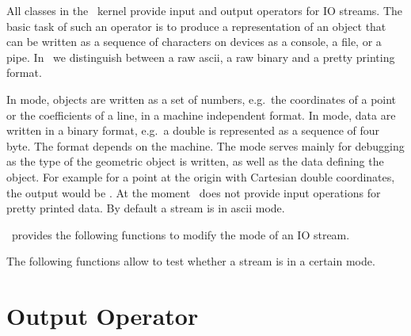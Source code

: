 
All classes in the \cgal\ kernel provide input and output operators for
IO streams.  The basic task of such an operator is to produce a
representation of an object that can be written as a sequence of
characters on devices as a console, a file, or a pipe. In \cgal\ 
we distinguish between  a raw ascii, a raw binary and a 
pretty printing format. 



In  mode, objects are written as
a set of  numbers, e.g.\ the coordinates of a point or
the coefficients of a line, in a machine independent format. 
In  mode,
data are written in a binary format, e.g.\ a double is represented
as a sequence of four byte. The format depends on the machine. 
The mode  
serves mainly for debugging as the type of the geometric
object is written, as well as the data defining the object. For example
for a point at the origin with Cartesian double coordinates, the output
would be \ccc{PointC2(0.0, 0.0)}.  At the moment \cgal\ does not
provide input operations for pretty printed data. By default a stream
is in {\sc ascii} mode.


\cgal\ provides the following functions to modify the mode of an IO stream.


\ccGlue
{}
\ccGlue
{}

The following functions allow to test whether a stream is in a certain mode.


\ccGlue
{}
\ccGlue
{}




\section{Output Operator}

